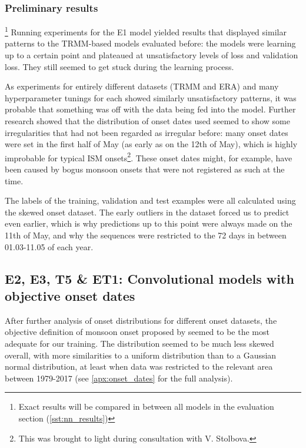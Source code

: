 \subsubsection{Preliminary results}{\footnote{Exact results will be compared in between all models in the evaluation section (\cref{sst:nn_results})}}
\label{ssst:nn_e1_results}
Running experiments for the E1 model yielded results that displayed similar patterns to the TRMM-based models evaluated before: the models were learning up to a certain point and plateaued at unsatisfactory levels of loss and validation loss. They still seemed to get stuck during the learning process.

As experiments for entirely different datasets (TRMM and ERA) and many hyperparameter tunings for each showed similarly unsatisfactory patterns, it was probable that something was off with the data being fed into the model. Further research showed that the distribution of onset dates used seemed to show some irregularities that had not been regarded as irregular before: many onset dates were set in the first half of May (as early as on the 12th of May), which is highly improbable for typical ISM onsets\footnote{This was brought to light during consultation with V. Stolbova.}. These onset dates might, for example, have been caused by bogus monsoon onsets that were not registered as such at the time.

The labels of the training, validation and test examples were all calculated using the skewed onset dataset. The early outliers in the dataset forced us to predict even earlier, which is why predictions up to this point were always made on the 11th of May, and why the sequences were restricted to the 72 days in between 01.03-11.05 of each year.


\clearpage
\subsection{E2, E3, T5 \& ET1: Convolutional models with objective onset dates}
\label{sst:nn_e2t5}
After further analysis of onset distributions for different onset datasets, the objective definition of monsoon onset proposed by \citet{Singh.2009} seemed to be the most adequate for our training. The distribution seemed to be much less skewed overall, with more similarities to a uniform distribution than to a Gaussian normal distribution, at least when data was restricted to the relevant area between 1979-2017 (see \cref{apx:onset_dates} for the full analysis).

